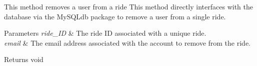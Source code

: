 This method removes a user from a ride This method directly interfaces with the database via the My\-S\-Q\-Ldb package to remove a user from a single ride. 


\begin{DoxyParams}{Parameters}
{\em ride\-\_\-\-I\-D} & The ride I\-D associated with a unique ride. \\
\hline
{\em email} & The email address associated with the account to remove from the ride. \\
\hline
\end{DoxyParams}
\begin{DoxyReturn}{Returns}
void 
\end{DoxyReturn}
